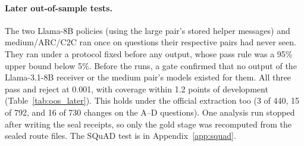 \paragraph{Later out-of-sample tests.} The two Llama-8B policies (using the large pair's stored helper messages) and medium/ARC/C2C ran once on questions their respective pairs had never seen. They ran under a protocol fixed before any output, whose pass rule was a 95\% upper bound below 5\%. Before the runs, a gate confirmed that no output of the Llama-3.1-8B receiver or the medium pair's models existed for them. All three pass and reject at 0.001, with coverage within 1.2 points of development (Table~\ref{tab:oos_later}). This holds under the official extraction too (3 of 440, 15 of 792, and 16 of 730 changes on the A--D questions). One analysis run stopped after writing the seal receipts, so only the gold stage was recomputed from the sealed route files. The SQuAD test is in Appendix~\ref{app:squad}.


